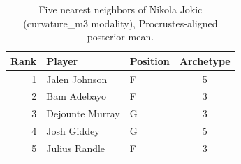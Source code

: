 \begin{table}[htbp]
  \centering\small
  \begin{tabular}{rllc}
    \toprule
    Rank & Player & Position & Archetype \\
    \midrule
    1 & Jalen Johnson & F & 5 \\
    2 & Bam Adebayo & F & 3 \\
    3 & Dejounte Murray & G & 3 \\
    4 & Josh Giddey & G & 5 \\
    5 & Julius Randle & F & 3 \\
    \bottomrule
  \end{tabular}
  \caption{Five nearest neighbors of Nikola Jokic (curvature_m3 modality), Procrustes-aligned posterior mean.}
  \label{tab:Nikola_Jokic_neighbors_curvature_m3}
\end{table}

